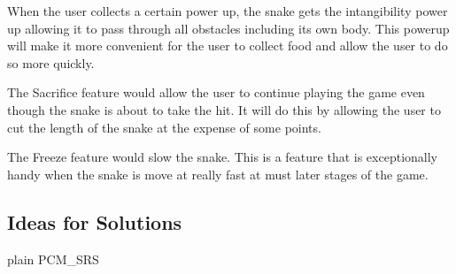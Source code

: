 \documentclass[12pt]{article}
\newcounter{goalnum} %
\begin{document}
When the user collects a certain power up, the snake gets the intangibility power up allowing it to pass through all obstacles including its own body. This powerup will make it more convenient for the user to collect food and allow the user to do so more quickly.

The Sacrifice feature would allow the user to continue playing the game even though the snake is about to take the hit. It will do this by allowing the user to cut the length of the snake at the expense of some points.

The Freeze feature would slow the snake. This is a feature that is exceptionally handy when the snake is move at really fast at must later stages of the game.
\subsection{Ideas for Solutions}






 {plain}
 {PCM_SRS}
\end{document}
